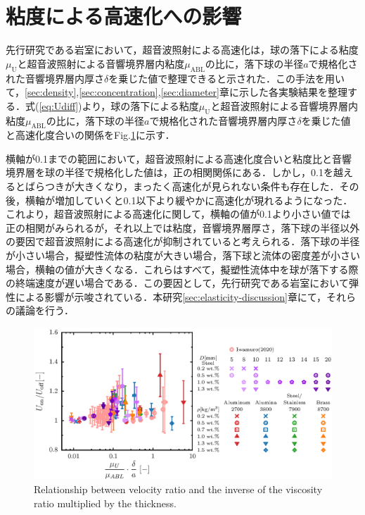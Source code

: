 \section{粘度による高速化への影響}
\label{sec:viscosity}
先行研究である岩室\cite{ref:8}において，超音波照射による高速化は，球の落下による粘度$\mu_\text{U}$と超音波照射による音響境界層内粘度$\mu_\text{ABL}$の比に，落下球の半径$a$で規格化された音響境界層内厚さ$\delta$を乗じた値で整理できると示された．この手法を用いて，\ref{sec:density},\ref{sec:concentration},\ref{sec:diameter}章に示した各実験結果を整理する．式(\ref{eq:Udiff})より，球の落下による粘度$\mu_\text{U}$と超音波照射による音響境界層内粘度$\mu_\text{ABL}$の比に，落下球の半径$a$で規格化された音響境界層内厚さ$\delta$を乗じた値と高速化度合いの関係をFig.\ref{fig:viscosity_ratio}に示す．

横軸が0.1までの範囲において，超音波照射による高速化度合いと粘度比と音響境界層を球の半径で規格化した値は，正の相関関係にある．しかし，0.1を越えるとばらつきが大きくなり，まったく高速化が見られない条件も存在した．その後，横軸が増加していくと0.1以下より緩やかに高速化が現れるようになった．これより，超音波照射による高速化に関して，横軸の値が0.1より小さい値では正の相関がみられるが，それ以上では粘度，音響境界層厚さ，落下球の半径以外の要因で超音波照射による高速化が抑制されていると考えられる．落下球の半径が小さい場合，擬塑性流体の粘度が大きい場合，落下球と流体の密度差が小さい場合，横軸の値が大きくなる．これらはすべて，擬塑性流体中を球が落下する際の終端速度が遅い場合である．この要因として，先行研究である岩室\cite{ref:8}において弾性による影響が示唆されている．本研究\ref{sec:elasticity-discussion}章にて，それらの議論を行う．

\begin{figure}[ht]
    \centering
    \includegraphics[width=1.0\textwidth]{5-Results/viscosity.eps}
    \caption{Relationship between velocity ratio and the inverse of the viscosity ratio multiplied by the thickness.}
    \label{fig:viscosity_ratio}
\end{figure}
